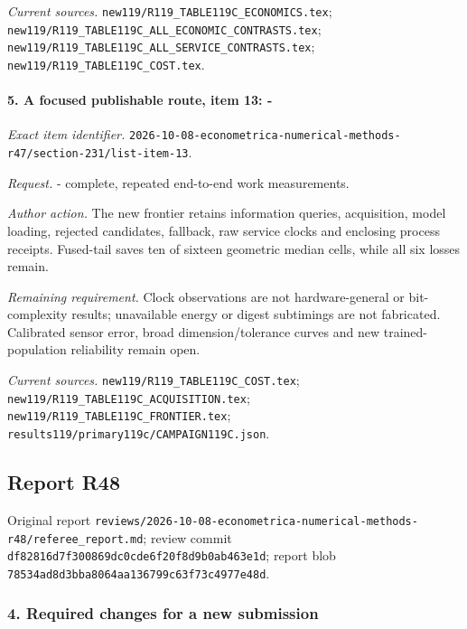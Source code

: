 \par\emph{Current sources.} \nolinkurl{new119/R119_TABLE119C_ECONOMICS.tex}; \nolinkurl{new119/R119_TABLE119C_ALL_ECONOMIC_CONTRASTS.tex}; \nolinkurl{new119/R119_TABLE119C_ALL_SERVICE_CONTRASTS.tex}; \nolinkurl{new119/R119_TABLE119C_COST.tex}.

\paragraph{5. A focused publishable route, item 13: -}

\emph{Exact item identifier.} \nolinkurl{2026-10-08-econometrica-numerical-methods-r47/section-231/list-item-13}.

\par\emph{Request.} - complete, repeated end-to-end work measurements.

\par\emph{Author action.} The new frontier retains information queries, acquisition, model loading, rejected candidates, fallback, raw service clocks and enclosing process receipts. Fused-tail saves ten of sixteen geometric median cells, while all six losses remain.

\par\emph{Remaining requirement.} Clock observations are not hardware-general or bit-complexity results; unavailable energy or digest subtimings are not fabricated. Calibrated sensor error, broad dimension/\allowbreak{}tolerance curves and new trained-population reliability remain open.

\par\emph{Current sources.} \nolinkurl{new119/R119_TABLE119C_COST.tex}; \nolinkurl{new119/R119_TABLE119C_ACQUISITION.tex}; \nolinkurl{new119/R119_TABLE119C_FRONTIER.tex}; \nolinkurl{results119/primary119c/CAMPAIGN119C.json}.

\subsection{Report R48}

Original report \nolinkurl{reviews/2026-10-08-econometrica-numerical-methods-r48/referee_report.md}; review commit \nolinkurl{df82816d7f300869dc0cde6f20f8d9b0ab463e1d}; report blob \nolinkurl{78534ad8d3bba8064aa136799c63f73c4977e48d}.

\subsubsection{4. Required changes for a new submission}

